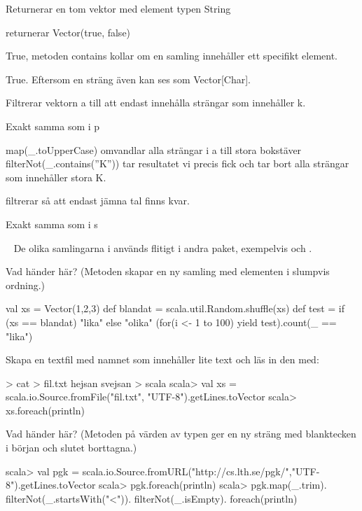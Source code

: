 {{\SubtaskSolved
Returnerar en tom vektor med element typen String

\SubtaskSolved
returnerar Vector(true, false)

\SubtaskSolved
True, metoden contains kollar om en samling innehåller ett specifikt element.

\SubtaskSolved
True. Eftersom en sträng även kan ses som Vector[Char].

\SubtaskSolved
Filtrerar vektorn a till att endast innehålla strängar som innehåller k.

\SubtaskSolved
Exakt samma som i p

\SubtaskSolved
map(\_.toUpperCase) omvandlar alla strängar i a till stora bokstäver
filterNot(\_.contains(''K'')) tar resultatet vi precis fick och tar bort alla strängar som innehåller stora K.

\SubtaskSolved
filtrerar så att endast jämna tal finns kvar.

\SubtaskSolved
Exakt samma som i s




\QUESTEND









\QUESTBEGIN

\Task  \what~ De olika samlingarna i  används flitigt i andra paket, exempelvis  och .

\Subtask Vad händer här? (Metoden  skapar en ny samling med elementen i slumpvis ordning.)
\begin{REPL}
val xs = Vector(1,2,3)
def blandat = scala.util.Random.shuffle(xs)
def test = if (xs == blandat) "lika" else "olika"
(for(i <- 1 to 100) yield test).count(_ == "lika")
\end{REPL}


\Subtask Skapa en textfil med namnet  som innehåller lite text och läs in den med: \\
\begin{REPL}
> cat > fil.txt
hejsan
svejsan
> scala
scala> val xs = scala.io.Source.fromFile("fil.txt", "UTF-8").getLines.toVector
scala> xs.foreach(println)
\end{REPL}


\Subtask Vad händer här? (Metoden  på värden av typen  ger en ny sträng med blanktecken i början och slutet borttagna.)
\begin{REPL}
scala> val pgk =
  scala.io.Source.fromURL("http://cs.lth.se/pgk/","UTF-8").getLines.toVector
scala> pgk.foreach(println)
scala> pgk.map(_.trim).
         filterNot(_.startsWith("<")).
         filterNot(_.isEmpty).
         foreach(println)
\end{REPL}



}}
